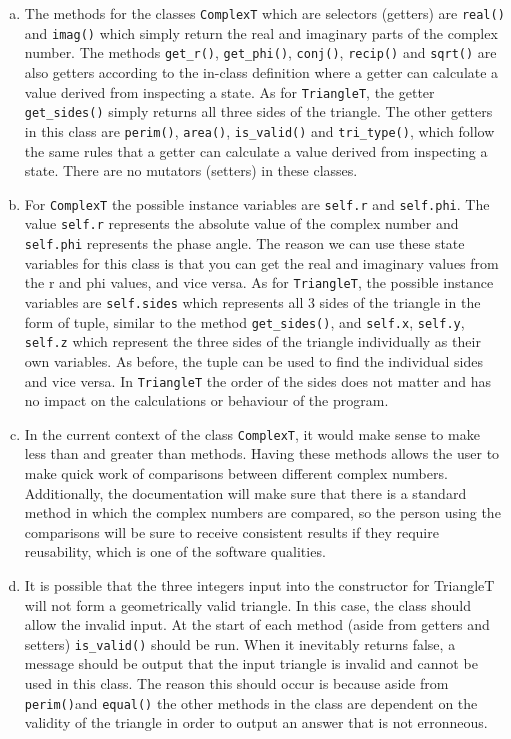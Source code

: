 \documentclass[12pt]{article}
\begin{document}
\begin{enumerate}[(a)]
\item The methods for the classes \verb|ComplexT| which are selectors (getters) are \verb|real()| and \verb|imag()| which simply return the real and imaginary parts of the complex number. The methods \verb|get_r()|, \verb|get_phi()|, \verb|conj()|, \verb|recip()| and \verb|sqrt()| are also getters according to the in-class definition where a getter can calculate a value derived from inspecting a state. As for \verb|TriangleT|, the getter \verb|get_sides()| simply returns all three sides of the triangle. The other getters in this class are \verb|perim()|, \verb|area()|, \verb|is_valid()| and \verb|tri_type()|, which follow the same rules that a getter can calculate a value derived from inspecting a state. There are no mutators (setters) in these classes. 
\item For \verb|ComplexT| the possible instance variables are \verb|self.r| and \verb|self.phi|. The value \verb|self.r| represents the absolute value of the complex number and \verb|self.phi| represents the phase angle. The reason we can use these state variables for this class is that you can get the real and imaginary values from the r and phi values, and vice versa. As for \verb|TriangleT|, the possible instance variables are \verb|self.sides| which represents all 3 sides of the triangle in the form of tuple, similar to the method \verb|get_sides()|, and \verb|self.x|, \verb|self.y|, \verb|self.z| which represent the three sides of the triangle individually as their own variables. As before, the tuple can be used to find the individual sides and vice versa. In \verb|TriangleT| the order of the sides does not matter and has no impact on the calculations or behaviour of the program. 
\item In the current context of the class \verb|ComplexT|, it would make sense to make less than and greater than methods. Having these methods allows the user to make quick work of comparisons between different complex numbers. Additionally, the documentation will make sure that there is a standard method in which the complex numbers are compared, so the person using the comparisons will be sure to receive consistent results if they require reusability, which is one of the software qualities.
\item It is possible that the three integers input into the constructor for TriangleT will not form a geometrically valid triangle. In this case, the class should allow the invalid input. At the start of each method (aside from getters and setters) \verb|is_valid()| should be run. When it inevitably returns false, a message should be output that the input triangle is invalid and cannot be used in this class. The reason this should occur is because aside from \verb|perim()|and \verb|equal()| the other methods in the class are dependent on the validity of the triangle in order to output an answer that is not erronneous. 

\end{enumerate}
\end{document}

